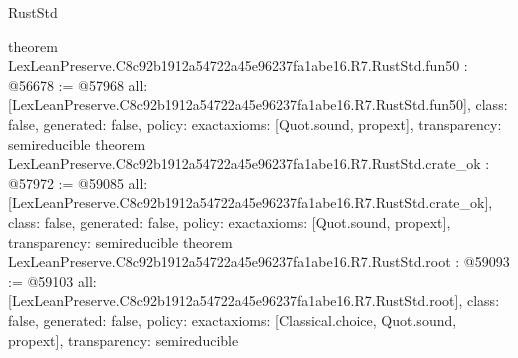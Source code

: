 \begin{lexlean}{RustStd}
\begin{coremodule}
{}
theorem LexLeanPreserve.C8c92b1912a54722a45e96237fa1abe16.R7.RustStd.fun50 : @56678 := @57968 {
  all: [LexLeanPreserve.C8c92b1912a54722a45e96237fa1abe16.R7.RustStd.fun50],
  class: false,
  generated: false,
  policy: exact{axioms: [Quot.sound, propext]},
  transparency: semireducible
}
theorem LexLeanPreserve.C8c92b1912a54722a45e96237fa1abe16.R7.RustStd.crate_ok : @57972 := @59085 {
  all: [LexLeanPreserve.C8c92b1912a54722a45e96237fa1abe16.R7.RustStd.crate_ok],
  class: false,
  generated: false,
  policy: exact{axioms: [Quot.sound, propext]},
  transparency: semireducible
}
theorem LexLeanPreserve.C8c92b1912a54722a45e96237fa1abe16.R7.RustStd.root : @59093 := @59103 {
  all: [LexLeanPreserve.C8c92b1912a54722a45e96237fa1abe16.R7.RustStd.root],
  class: false,
  generated: false,
  policy: exact{axioms: [Classical.choice, Quot.sound, propext]},
  transparency: semireducible
}


\end{coremodule}
\end{lexlean}
